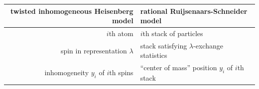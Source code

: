 \documentclass[11pt]{report}
\theoremstyle{definition}
\theoremstyle{remark}
\theoremstyle{remark}
\begin{document}
\begin{center}
\begin{tabular}{|r||l|}
\hline
twisted inhomogeneous Heisenberg model & rational Ruijsenaars-Schneider model \\
\hline
$i$th atom & $i$th stack of particles \\
spin in representation $\lambda$ & stack satisfying $\lambda$-exchange statistics \\
inhomogeneity $y_i$ of $i$th spins & ``center of mass'' position $y_i$ of $i$th stack \\
\hline
\end{tabular}
\end{center}
\end{document}
